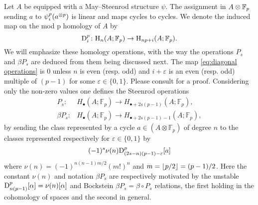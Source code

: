 Let $A$ be equipped with a May--Steenrod structure $\psi$.
The assignment in $A \otimes {\mathbb{F}_p}$ sending $a$ to $\psi_i^p(a^{\otimes p})$ is linear and maps cycles to cycles.
We denote the induced map on the mod p homology of $A$ by
\begin{equation}\label{eq:diagonal operations}
	\mathrm{D}_i^p \colon \mathrm{H}_n(A; {\mathbb{F}_p}) \to \mathrm{H}_{np+i}(A; {\mathbb{F}_p}).
\end{equation}
We will emphasize these homology operations, with the way the operations $P_s$ and $\beta P_s$ are deduced from them being discussed next.
The map \eqref{eq:diagonal operations} is $0$ unless $n$ is even (resp. odd) and $i+\varepsilon$ is an even (resp. odd) multiple of $(p-1)$ for some $\varepsilon \in \{0,1\}$.
Please consult \cite[Proposition 2.3. (iv)]{may1970general} for a proof.
Considering only the non-zero values one defines the Steenrod operations
\begin{align*}
	P_s \colon& H_\bullet(A; \mathbb{F}_p) \to H_{\bullet + 2s(p-1)}(A; \mathbb{F}_p), \\
	\beta P_s \colon& H_\bullet(A; \mathbb{F}_p) \to H_{\bullet + 2s(p-1) - 1}(A; \mathbb{F}_p),
\end{align*}
by sending the class represented by a cycle $a \in (A \otimes \mathbb{F}_p)$ of degree $n$ to the classes represented respectively for $\varepsilon \in \{0,1\}$ by
\begin{equation*}
	(-1)^s \nu(n) \mathrm{D}^p_{(2s-n)(p-1)-\varepsilon}[a]
\end{equation*}
where $\nu(n) = (-1)^{n(n-1)m/2}(m!)^n$ and $m = \lfloor p/2\rfloor = (p-1)/2$.
Here the constant $\nu(n)$ and notation $\beta P_s$ are respectively motivated by the unstable
$\mathrm{D}_{n(p-1)}^p[\alpha] = \nu(n)[\alpha]$ and Bockstein $\beta P_s = \beta \circ P_s$ relations, the first holding in the cohomology of spaces and the second in general.
